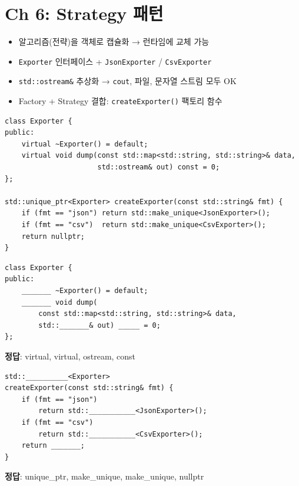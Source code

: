\documentclass[11pt,a4paper]{article}
\newcommand{\code}[1]{\texttt{#1}}
\begin{document}
\section{Ch 6: Strategy 패턴}

\begin{conceptbox}[title={Strategy 패턴}]
\begin{itemize}[nosep]
\item 알고리즘(전략)을 객체로 캡슐화 → 런타임에 교체 가능
\item \code{Exporter} 인터페이스 + \code{JsonExporter} / \code{CsvExporter}
\item \code{std::ostream\&} 추상화 → \code{cout}, 파일, 문자열 스트림 모두 OK
\item Factory + Strategy 결합: \code{createExporter()} 팩토리 함수
\end{itemize}
\end{conceptbox}

\begin{lstlisting}[style=cpp,title={Exporter 인터페이스 + Factory}]
class Exporter {
public:
    virtual ~Exporter() = default;
    virtual void dump(const std::map<std::string, std::string>& data,
                      std::ostream& out) const = 0;
};

std::unique_ptr<Exporter> createExporter(const std::string& fmt) {
    if (fmt == "json") return std::make_unique<JsonExporter>();
    if (fmt == "csv")  return std::make_unique<CsvExporter>();
    return nullptr;
}
\end{lstlisting}

\begin{quizbox}[title={Q6-1: Exporter 인터페이스}]
\begin{lstlisting}[style=cpp,numbers=none]
class Exporter {
public:
    _______ ~Exporter() = default;
    _______ void dump(
        const std::map<std::string, std::string>& data,
        std::_______& out) _____ = 0;
};
\end{lstlisting}
\textbf{정답}: virtual, virtual, ostream, const
\end{quizbox}

\begin{quizbox}[title={Q6-2: createExporter}]
\begin{lstlisting}[style=cpp,numbers=none]
std::__________<Exporter>
createExporter(const std::string& fmt) {
    if (fmt == "json")
        return std::___________<JsonExporter>();
    if (fmt == "csv")
        return std::___________<CsvExporter>();
    return _______;
}
\end{lstlisting}
\textbf{정답}: unique\_ptr, make\_unique, make\_unique, nullptr
\end{quizbox}
\end{document}
